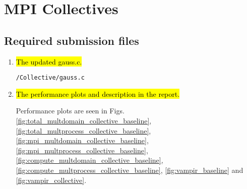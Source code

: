 
\section{MPI Collectives}
\subsection{Required submission files}
\begin{enumerate}
	\item \hl{The updated gauss.c.}
	
	\verb!/Collective/gauss.c!

	\item \hl{The performance plots and description in the report.}
		
	Performance plots are seen in Figs. \ref{fig:total_multdomain_collective_baseline}, \ref{fig:total_multprocess_collective_baseline}, \ref{fig:mpi_multdomain_collective_baseline},
	\ref{fig:mpi_multprocess_collective_baseline}, \ref{fig:compute_multdomain_collective_baseline},
	\ref{fig:compute_multprocess_collective_baseline}, \ref{fig:vampir_baseline} and \ref{fig:vampir_collective}.

\end{enumerate}

